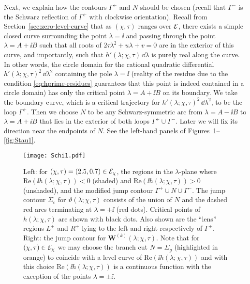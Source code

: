 Next, we explain how the contours $\Gamma^+$ and $N$ should be chosen (recall that $\Gamma^-$ is the Schwarz reflection of $\Gamma^+$ with clockwise orientation).  Recall from Section~\ref{sec:zero-level-curve} that as $(\chi,\tau)$ ranges over $\mathcal{E}$, there exists a simple closed curve surrounding the point $\lambda=\ii$ and passing through the point $\lambda=A+\ii B$ such that all roots of $2\tau\lambda^2+u\lambda+v=0$ are in the exterior of this curve, and importantly, such that $h'(\lambda;\chi,\tau)\,\dd\lambda$ is purely real along the curve.  In other words, the circle domain for the rational quadratic differential $h'(\lambda;\chi,\tau)^2\,\dd\lambda^2$ containing the pole $\lambda=\ii$ (reality of the residue due to the condition \eqref{eq:hprime-residues} guarantees that this point is indeed contained in a circle domain) has only the critical point $\lambda=A+\ii B$ on its boundary.  We take the boundary curve, which is a critical trajectory for $h'(\lambda;\chi,\tau)^2\,\dd\lambda^2$, to be the loop $\Gamma^+$.  Then we choose $N$ to be any Schwarz-symmetric arc from $\lambda=A-\ii B$ to $\lambda=A+\ii B$ that lies in the exterior of both loops $\Gamma^+\cup \Gamma^-$.  Later we will fix its direction near the endpoints of $N$.  See the left-hand panels of Figures~\ref{fig:Schi1}--\ref{fig:Stau1}.

\begin{figure}[h]
\begin{center}
\texttt{[image: Schi1.pdf]}
\end{center}
\caption{Left:  for $(\chi,\tau)=(2.5,0.7)\in \mathcal{E}_\chi$, the regions in the $\lambda$-plane where $\mathrm{Re}(\ii h(\lambda;\chi,\tau))<0$ (shaded) and $\mathrm{Re}(\ii h(\lambda;\chi,\tau))>0$ (unshaded), and the modified jump contour $\Gamma^+\cup N\cup\Gamma^-$.  The jump contour $\Sigma_\mathrm{c}$ for $\vartheta(\lambda;\chi,\tau)$ consists of the union of $N$ and the dashed red arcs terminating at $\lambda=\pm\ii$ (red dots).  Critical points of $h(\lambda;\chi,\tau)$ are shown with black dots.  Also shown are the ``lens'' regions $L^\pm$ and $R^\pm$ lying to the left and right respectively of $\Gamma^\pm$.  Right:  the jump contour for $\mathbf{W}^{(k)}(\lambda;\chi,\tau)$.  Note that for $(\chi,\tau)\in \mathcal{E}_\chi$ we may choose the branch cut $N=\Sigma_g$ (highlighted in orange) to coincide with a level curve of $\mathrm{Re}(\ii h(\lambda;\chi,\tau))$ and with this choice $\mathrm{Re}(\ii h(\lambda;\chi,\tau))$ is a continuous function with the exception of the points $\lambda=\pm \ii$.}
\label{fig:Schi1}
\end{figure}

